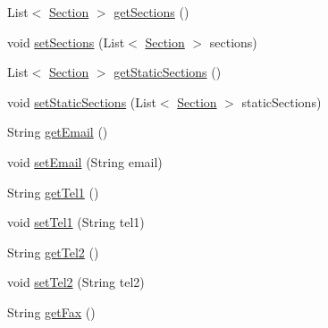 \begin{DoxyCompactItemize}
\item 
List$<$ \hyperlink{classpl_1_1edu_1_1uwb_1_1mobiuwb_1_1parsers_1_1xml_1_1parser_1_1_section}{Section} $>$ \hyperlink{classpl_1_1edu_1_1uwb_1_1mobiuwb_1_1parsers_1_1xml_1_1parser_1_1_university_unit_a800a16d9a85994a3610c1baacd449cd1}{get\+Sections} ()
\item 
void \hyperlink{classpl_1_1edu_1_1uwb_1_1mobiuwb_1_1parsers_1_1xml_1_1parser_1_1_university_unit_aae522ff87257088835e18849b730fcf5}{set\+Sections} (List$<$ \hyperlink{classpl_1_1edu_1_1uwb_1_1mobiuwb_1_1parsers_1_1xml_1_1parser_1_1_section}{Section} $>$ sections)
\item 
List$<$ \hyperlink{classpl_1_1edu_1_1uwb_1_1mobiuwb_1_1parsers_1_1xml_1_1parser_1_1_section}{Section} $>$ \hyperlink{classpl_1_1edu_1_1uwb_1_1mobiuwb_1_1parsers_1_1xml_1_1parser_1_1_university_unit_ac86d528c11fd7261524c2ee9f9f36811}{get\+Static\+Sections} ()
\item 
void \hyperlink{classpl_1_1edu_1_1uwb_1_1mobiuwb_1_1parsers_1_1xml_1_1parser_1_1_university_unit_aadb0599a3bb6e169fa4e359b3fd7eedb}{set\+Static\+Sections} (List$<$ \hyperlink{classpl_1_1edu_1_1uwb_1_1mobiuwb_1_1parsers_1_1xml_1_1parser_1_1_section}{Section} $>$ static\+Sections)
\item 
String \hyperlink{classpl_1_1edu_1_1uwb_1_1mobiuwb_1_1parsers_1_1xml_1_1parser_1_1_university_unit_ae87b9860182c3bef0c94a8d96f6e70fa}{get\+Email} ()
\item 
void \hyperlink{classpl_1_1edu_1_1uwb_1_1mobiuwb_1_1parsers_1_1xml_1_1parser_1_1_university_unit_ab8b71de5c1c72947da016fc85dfead29}{set\+Email} (String email)
\item 
String \hyperlink{classpl_1_1edu_1_1uwb_1_1mobiuwb_1_1parsers_1_1xml_1_1parser_1_1_university_unit_a963b197b4da09dea2013d90bddfd1229}{get\+Tel1} ()
\item 
void \hyperlink{classpl_1_1edu_1_1uwb_1_1mobiuwb_1_1parsers_1_1xml_1_1parser_1_1_university_unit_ab2e458a56ccf660955a3f415506a9701}{set\+Tel1} (String tel1)
\item 
String \hyperlink{classpl_1_1edu_1_1uwb_1_1mobiuwb_1_1parsers_1_1xml_1_1parser_1_1_university_unit_aa2ee2efbf3dbfbfd813c7db88cbaa8df}{get\+Tel2} ()
\item 
void \hyperlink{classpl_1_1edu_1_1uwb_1_1mobiuwb_1_1parsers_1_1xml_1_1parser_1_1_university_unit_a75eaa28a29b2534fe59cd2433c9685a8}{set\+Tel2} (String tel2)
\item 
String \hyperlink{classpl_1_1edu_1_1uwb_1_1mobiuwb_1_1parsers_1_1xml_1_1parser_1_1_university_unit_a99e5ff9ecf5ff642a79651fc6f296b04}{get\+Fax} ()

\end{DoxyCompactItemize}
